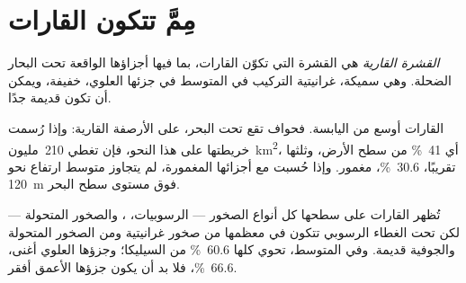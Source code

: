 \section{مِمَّ تتكون القارات}

\begin{definition}\label{def:g12:continental-crust:continental-crust}
\emph{القشرة القارية} هي القشرة التي
تكوّن القارات، بما فيها أجزاؤها الواقعة تحت البحار الضحلة. وهي
سميكة، غرانيتية التركيب في المتوسط في جزئها العلوي، خفيفة، ويمكن
أن تكون قديمة جدًا.
\end{definition}

القارات أوسع من اليابسة. فحواف 
تقع تحت البحر، على الأرصفة القارية: وإذا رُسمت خريطتها على هذا النحو، فإن
 تغطي \num{210}~مليون~\unit{km^2}، أي \qty{41}{\percent} من
سطح الأرض، وثلثها تقريبًا، \qty{30.6}{\percent}، مغمور. وإذا
حُسبت مع أجزائها المغمورة، لم يتجاوز متوسط ارتفاع  نحو \qty{120}{m} فوق مستوى سطح البحر.

تُظهر القارات على سطحها كل أنواع الصخور --- الرسوبيات،
، والصخور المتحولة --- لكن  تحت الغطاء الرسوبي
تتكون في معظمها من صخور غرانيتية ومن الصخور المتحولة
والجوفية  قديمة. وفي المتوسط، تحوي  كلها
\qty{60.6}{\percent} من السيليكا؛ وجزؤها العلوي أغنى،
\qty{66.6}{\percent}، فلا بد أن يكون جزؤها الأعمق أفقر.

